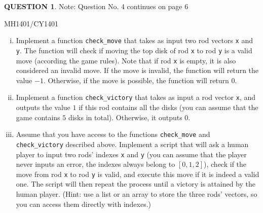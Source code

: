 \documentclass[a4paper,12pt]{article}
\theoremstyle{definition}
\newtheorem{ques}[dummy]{QUESTION}
\theoremstyle{plain}
\newcommand{\ttx}[1]{\texttt{#1}}
\begin{document}
\begin{ques}
	\quad Note: Question No. 4 continues on page 6
	
	\newpage
	
	\hfill MH1401/CY1401\vspace*{0.5em}
	
	\begin{enumerate}[(i)]
		\item Implement a function \ttx{check\_move} that takes as input two rod vectors \ttx{x} and \ttx{y}. The function will check if moving the top disk of rod \ttx{x} to rod \ttx{y} is a valid move (according the game rules). Note that if rod \ttx{x} is empty, it is also considered an invalid move. If the move is invalid, the function will return the value $-1$. Otherwise, if the move is possible, the function will return $0$.
		
		\item Implement a function \ttx{check\_victory} that takes as input a rod vector \ttx{x}, and outputs the value $1$ if this rod contains all the disks (you can assume that the game contains $5$ disks in total). Otherwise, it outputs $0$.
		
		\item Assume that you have access to the functions \ttx{check\_move} and \ttx{check\_victory} described above. Implement a script that will ask a human player to input two rods' indexes \ttx{x} and \ttx{y} (you can assume that the player never inputs an error, the indexes always belong to $[0,1,2]$), check if the move from rod \ttx{x} to rod \ttx{y} is valid, and execute this move if it is indeed a valid one. The script will then repeat the process until a victory is attained by the human player. (Hint: use a list or an array to store the three rods' vectors, so you can access them directly with indexes.)
	\end{enumerate}
\end{ques}
\end{document}
